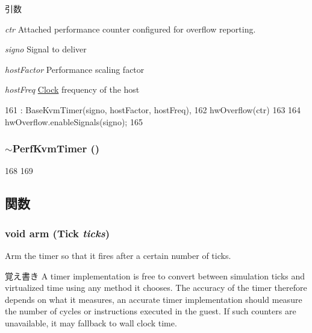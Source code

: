 \begin{DoxyParams}{引数}
\item[{\em ctr}]Attached performance counter configured for overflow reporting. \item[{\em signo}]Signal to deliver \item[{\em hostFactor}]Performance scaling factor \item[{\em hostFreq}]\hyperlink{classClock}{Clock} frequency of the host \end{DoxyParams}



\begin{DoxyCode}
161     : BaseKvmTimer(signo, hostFactor, hostFreq),
162       hwOverflow(ctr)
163 {
164     hwOverflow.enableSignals(signo);
165 }
\end{DoxyCode}
\hypertarget{classPerfKvmTimer_a0095b8dff4f2db7d8d44674689127373}{
\subsubsection[{$\sim$PerfKvmTimer}]{\setlength{\rightskip}{0pt plus 5cm}$\sim${\bf PerfKvmTimer} ()}}
\label{classPerfKvmTimer_a0095b8dff4f2db7d8d44674689127373}



\begin{DoxyCode}
168 {
169 }
\end{DoxyCode}


\subsection{関数}
\hypertarget{classPerfKvmTimer_a5041ff590d50fcb1f0f5149b2e7eb4bb}{
\subsubsection[{arm}]{\setlength{\rightskip}{0pt plus 5cm}void arm ({\bf Tick} {\em ticks})}}
\label{classPerfKvmTimer_a5041ff590d50fcb1f0f5149b2e7eb4bb}
Arm the timer so that it fires after a certain number of ticks.

\begin{DoxyNote}{覚え書き}
A timer implementation is free to convert between simulation ticks and virtualized time using any method it chooses. The accuracy of the timer therefore depends on what it measures, an accurate timer implementation should measure the number of cycles or instructions executed in the guest. If such counters are unavailable, it may fallback to wall clock time.
\end{DoxyNote}

